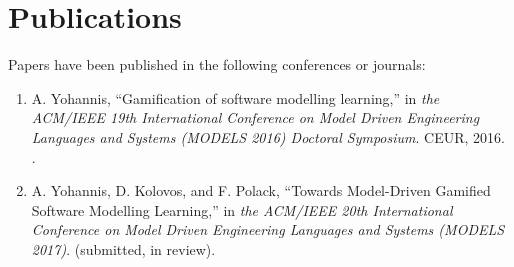 \documentclass[12pt, a4paper]{report} \usepackage[titletoc]{appendix}
\begin{document}
\chapter{Publications}
\label{Publications}
Papers have been published in the following conferences or journals: 
\begin{enumerate}
 \item A. Yohannis, ``Gamification of software modelling learning,'' in
 \textit{the ACM/IEEE 19th International Conference on Model Driven Engineering Languages and Systems (MODELS 2016) Doctoral Symposium}. CEUR, 2016. \cite{Yohannis2016}.
 \item A. Yohannis, D. Kolovos, and F. Polack, ``Towards Model-Driven Gamified Software Modelling Learning,'' in \textit{the ACM/IEEE 20th International Conference on Model Driven Engineering Languages and Systems (MODELS 2017)}. (submitted, in review).
\end{enumerate}







\end{document}
